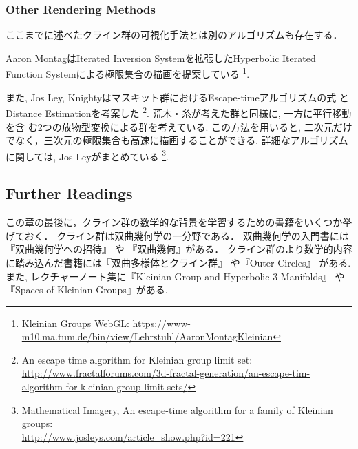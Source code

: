 \subsubsection{Other Rendering Methods}

ここまでに述べたクライン群の可視化手法とは別のアルゴリズムも存在する．

Aaron MontagはIterated Inversion Systemを拡張したHyperbolic Iterated
Function Systemによる極限集合の描画を提案している\cite{Montag2014hyperbolicIFS}
\footnote{Kleinian Groups WebGL:
 \url{https://www-m10.ma.tum.de/bin/view/Lehrstuhl/AaronMontagKleinian}}.

また, Jos Ley, Knightyはマスキット群におけるEscape-timeアルゴリズムの式
とDistance Estimationを考案した
\footnote{An escape time algorithm for Kleinian group limit set:\\ \quad
\quad \url{http://www.fractalforums.com/3d-fractal-generation/an-escape-tim-algorithm-for-kleinian-group-limit-sets/}}.
荒木・糸\cite{araki2008extension}が考えた群と同様に, 一方に平行移動を含
む2つの放物型変換による群を考えている.
この方法を用いると, 二次元だけでなく，三次元の極限集合も高速に描画することができる.
詳細なアルゴリズムに関しては, Jos Leyがまとめている
\footnote{Mathematical Imagery, An escape-time algorithm for a family of
Kleinian groups:\\ \quad \quad \url{http://www.josleys.com/article_show.php?id=221}}.

\subsection{Further Readings}

この章の最後に，クライン群の数学的な背景を学習するための書籍をいくつか挙げておく．
クライン群は双曲幾何学の一分野である．
双曲幾何学の入門書には『双曲幾何学への招待』
\cite{taniguchi_okumura199610invitation}や
『双曲幾何』\cite{mitani200409hyperbolicGeometry}がある．
クライン群のより数学的内容に踏み込んだ書籍には『双曲多様体とクライン群』
\cite{taniguchi_matsuzaki_hyperbolicManifold}や『Outer Circles』
\cite{Marden200705outerCircles}がある.
また, レクチャーノート集に『Kleinian Group and Hyperbolic 3-Manifolds』
\cite{Y._V._C.200311}や
『Spaces of Kleinian Groups』\cite{Yair_Makoto_Caroline200606}がある.

\clearpage